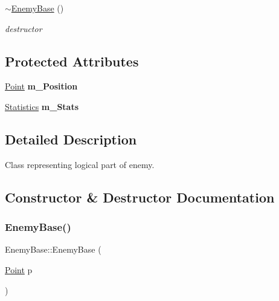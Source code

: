 \begin{DoxyCompactItemize}
\mbox{\label{class_enemy_base_a73d1ffb3230a2e8b2c0b7cd86cbd7a6c}} 
\mbox{\hyperlink{class_enemy_base_a73d1ffb3230a2e8b2c0b7cd86cbd7a6c}{$\sim$\+Enemy\+Base}} ()
\begin{DoxyCompactList}\small\item\em destructor \end{DoxyCompactList}\end{DoxyCompactItemize}
\subsection*{Protected Attributes}
\begin{DoxyCompactItemize}
\item 
\mbox{\label{class_enemy_base_af5e4b032a3bc2d9a4f3f82bb2bacfc98}} 
\mbox{\hyperlink{class_point}{Point}} {\bfseries m\+\_\+\+Position}
\item 
\mbox{\label{class_enemy_base_a2b4cce074350fa64dd888efa159526db}} 
\mbox{\hyperlink{class_statistics}{Statistics}} {\bfseries m\+\_\+\+Stats}
\end{DoxyCompactItemize}


\subsection{Detailed Description}
Class representing logical part of enemy. 

\subsection{Constructor \& Destructor Documentation}
\mbox{\label{class_enemy_base_a3a5fda450d95f680a394c171669a6266}} 
\subsubsection{\texorpdfstring{Enemy\+Base()}{EnemyBase()}\hspace{0.1cm}{\footnotesize\ttfamily [1/3]}}
{\footnotesize\ttfamily Enemy\+Base\+::\+Enemy\+Base (\begin{DoxyParamCaption}\item[{\mbox{\hyperlink{class_point}{Point}}}]{p }\end{DoxyParamCaption})}



